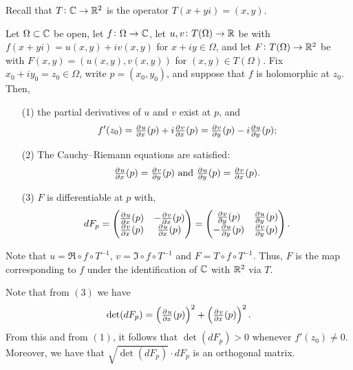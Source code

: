 \documentclass[11pt,a4paper]{article}
\begin{document}
Recall that $T \colon \mathbb{C} \to \mathbb{R}^2$ is the operator $T(x + y i) = (x,y)$.

\begin{proposition}
  \label{prop:pd}
  Let $\Omega \subset \mathbb{C}$ be open, let $f \colon \Omega \to \mathbb{C}$, let 
  $u,v \colon T(\Omega) \to \mathbb{R}$ be with $f(x + y i) = u(x,y) + i v(x,y)$
  for $x + i y \in \Omega$, and let $F \colon T(\Omega) \to \mathbb{R}^2$ be with
  $F(x,y) = (u(x,y), v(x,y))$ for $(x,y) \in T(\Omega)$.
  Fix $x_0 + i y_0 = z_0 \in \Omega$,
  write $p = (x_0, y_0)$, and suppose that $f$ is holomorphic at $z_0$.
  Then,
  \begin{enumerate}
    \item[(1)] the partial derivatives of $u$ and $v$ exist at $p$, and
      \[
        f'(z_0) =
        \pd{u}{x}(p) + i \pd{v}{x}(p) =
        \pd{v}{y}(p) - i \pd{u}{y}(p);
      \]
    \item[(2)] The Cauchy--Riemann equations are satisfied:
      \[
        \pd{u}{x}(p) = \pd{v}{y}(p) \stand
        \pd{u}{y}(p) = \pd{v}{x}(p).
      \]
    \item[(3)] $F$ is differentiable at $p$ with,
      \[
        dF_p =
        \begin{pmatrix}
          \pd{u}{x}(p) & - \pd{v}{x}(p) \\
          \pd{v}{x}(p) & \pd{u}{x}(p) 
        \end{pmatrix} =
        \begin{pmatrix}
          \pd{v}{y}(p) & \pd{u}{y}(p) \\
          - \pd{u}{y}(p) & \pd{v}{y}(p) 
        \end{pmatrix}.
      \]
  \end{enumerate}
\end{proposition}

\begin{remark}
  Note that $u = \Re \circ f \circ T^{-1}$, $v = \Im \circ f \circ T^{-1}$
  and $F = T \circ f \circ T^{-1}$.
  Thus, $F$ is the map corresponding to $f$ under the identification of $\mathbb{C}$ 
  with $\mathbb{R}^2$ via $T$.
\end{remark}

\begin{remark}
  Note that from $(3)$ we have
  \[
    \det(dF_p) = \del{\pd{u}{x}(p)}^2 + \del{\pd{v}{x}(p)}^2.
  \]
  From this and from $(1)$, it follows that $\det(dF_p) > 0$ whenever
  $f'(z_0) \neq 0$.
  Moreover, we have that $\sqrt{\det(dF_p)} \cdot dF_p$ is an orthogonal
  matrix.
\end{remark}
\end{document}
